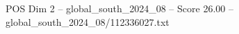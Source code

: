 \begin{textsample}{POS Dim 2 – global\_south\_2024\_08 – Score 26.00 – global\_south\_2024\_08/112336027.txt}
\end{textsample}
